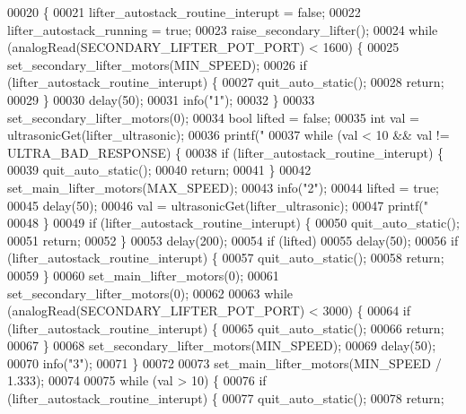 \begin{DoxyCode}
00020                                     \{
00021   lifter_autostack_routine_interupt = \textcolor{keyword}{false};
00022   lifter_autostack_running = \textcolor{keyword}{true};
00023   raise_secondary_lifter();
00024   \textcolor{keywordflow}{while} (analogRead(SECONDARY\_LIFTER\_POT\_PORT) < 1600) \{
00025     set_secondary_lifter_motors(MIN\_SPEED);
00026     \textcolor{keywordflow}{if} (lifter_autostack_routine_interupt) \{
00027       quit_auto_static();
00028       \textcolor{keywordflow}{return};
00029     \}
00030     delay(50);
00031     info(\textcolor{stringliteral}{"1"});
00032   \}
00033   set_secondary_lifter_motors(0);
00034   \textcolor{keywordtype}{bool} lifted = \textcolor{keyword}{false};
00035   \textcolor{keywordtype}{int} val = ultrasonicGet(lifter_ultrasonic);
00036   printf(\textcolor{stringliteral}{"%
00037   \textcolor{keywordflow}{while} (val < 10 && val != ULTRA\_BAD\_RESPONSE) \{
00038     \textcolor{keywordflow}{if} (lifter_autostack_routine_interupt) \{
00039       quit_auto_static();
00040       \textcolor{keywordflow}{return};
00041     \}
00042     set_main_lifter_motors(MAX\_SPEED);
00043     info(\textcolor{stringliteral}{"2"});
00044     lifted = \textcolor{keyword}{true};
00045     delay(50);
00046     val = ultrasonicGet(lifter_ultrasonic);
00047     printf(\textcolor{stringliteral}{"%
00048   \}
00049   \textcolor{keywordflow}{if} (lifter_autostack_routine_interupt) \{
00050     quit_auto_static();
00051     \textcolor{keywordflow}{return};
00052   \}
00053   delay(200);
00054   \textcolor{keywordflow}{if} (lifted)
00055     delay(50);
00056   \textcolor{keywordflow}{if} (lifter_autostack_routine_interupt) \{
00057     quit_auto_static();
00058     \textcolor{keywordflow}{return};
00059   \}
00060   set_main_lifter_motors(0);
00061   set_secondary_lifter_motors(0);
00062 
00063   \textcolor{keywordflow}{while} (analogRead(SECONDARY\_LIFTER\_POT\_PORT) < 3000) \{
00064     \textcolor{keywordflow}{if} (lifter_autostack_routine_interupt) \{
00065       quit_auto_static();
00066       \textcolor{keywordflow}{return};
00067     \}
00068     set_secondary_lifter_motors(MIN\_SPEED);
00069     delay(50);
00070     info(\textcolor{stringliteral}{"3"});
00071   \}
00072 
00073   set_main_lifter_motors(MIN\_SPEED / 1.333);
00074 
00075   \textcolor{keywordflow}{while} (val > 10) \{
00076     \textcolor{keywordflow}{if} (lifter_autostack_routine_interupt) \{
00077       quit_auto_static();
00078       \textcolor{keywordflow}{return};
}}
\end{DoxyCode}
